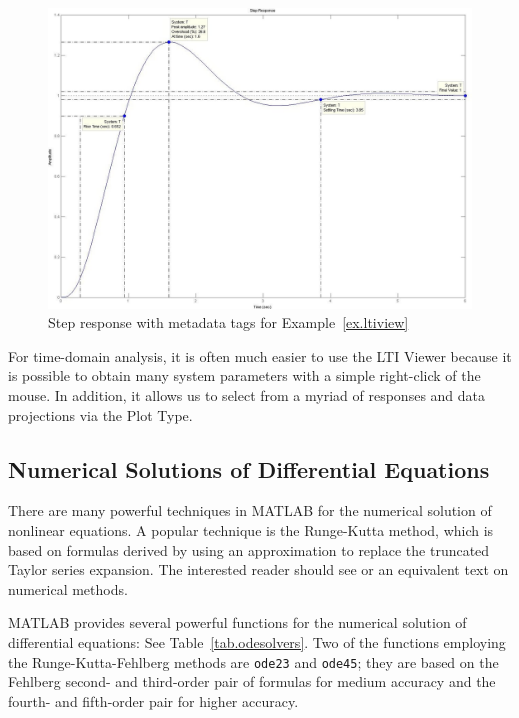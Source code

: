 \begin{figure}[bht]
\centering
\includegraphics[width=.9\textwidth]{ltiviewstep}
\caption{ \footnotesize
        Step response with metadata tags for Example~\ref{ex.ltiview}
        \label{fig.ex.ltiviewstep}
        }
\end{figure}
\par
For time-domain analysis, it is often much easier to use the LTI Viewer because it is possible to obtain many system parameters with a simple right-click of the mouse.  In addition, it allows us to select from a myriad of responses and data projections via the Plot Type.

\subsection{Numerical Solutions of Differential Equations}
There are many powerful techniques in MATLAB for the numerical solution of nonlinear equations.  A popular technique is the Runge-Kutta method, which is based on formulas derived by using an approximation to replace the truncated Taylor series expansion.  The interested reader should see \cite{butcher} or an equivalent text on numerical methods.
\par
MATLAB provides several powerful functions for the numerical solution of differential equations: See Table~\ref{tab.odesolvers}.  Two of the functions employing the Runge-Kutta-Fehlberg methods are \verb=ode23= and \verb=ode45=; they are based on the Fehlberg second- and third-order pair of formulas for medium accuracy and the fourth- and fifth-order pair for higher accuracy.

